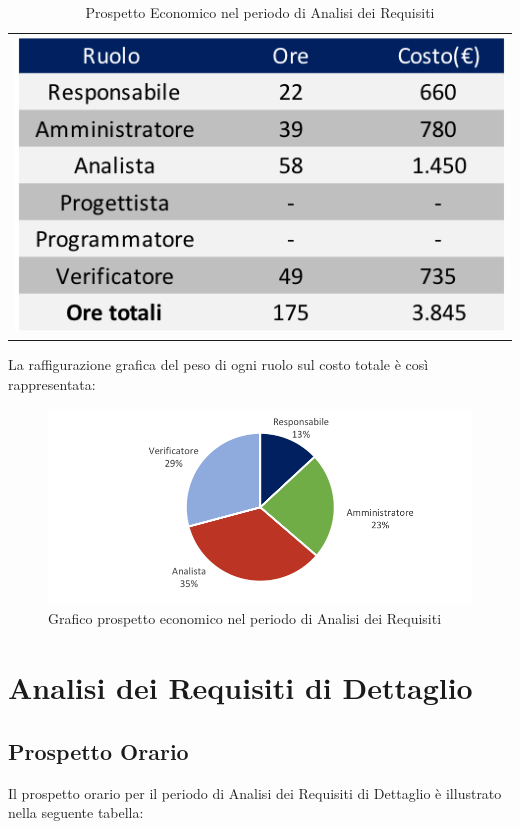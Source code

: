 \begin{table}[!ht]
	\begin{center}
		\begin{tabular}{c}
			\includegraphics{images/tabellaProspettoEconomico.png}
		\end{tabular}
		\caption{Prospetto Economico nel periodo di Analisi dei Requisiti}
	\end{center}
\end{table}
La raffigurazione grafica del peso di ogni ruolo sul costo totale è così rappresentata:
\begin{figure}[!ht]
	\centering
	\includegraphics{images/grafoProspettoEconomico.png}
	\caption{Grafico prospetto economico nel periodo di Analisi dei Requisiti }
\end{figure}

\newpage
\section{Analisi dei Requisiti di Dettaglio}
\subsection{Prospetto Orario}
Il prospetto orario per il periodo di Analisi dei Requisiti di Dettaglio è illustrato nella seguente tabella:

